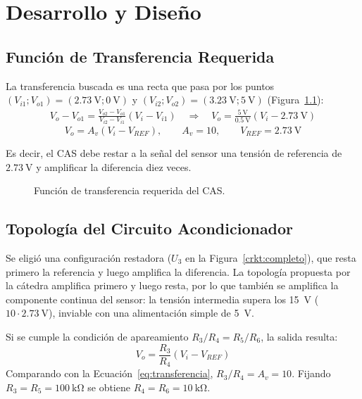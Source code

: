 \chapter{Desarrollo y Diseño}
\label{sec:desarrollo}

\section{Función de Transferencia Requerida}

La transferencia buscada es una recta que pasa por los puntos $(V_{i1}; V_{o1}) = (\SI{2.73}{\volt}; \SI{0}{\volt})$
y $(V_{i2}; V_{o2}) = (\SI{3.23}{\volt}; \SI{5}{\volt})$ (Figura~\ref{fig:transferencia_requerida}):
\begin{gather*}
  V_o - V_{o1} = \frac{V_{o2} - V_{o1}}{V_{i2} - V_{i1}} \left( V_i - V_{i1} \right)
  \quad\Rightarrow\quad
  V_o = \frac{\SI{5}{\volt}}{\SI{0.5}{\volt}} \left( V_i - \SI{2.73}{\volt} \right)
\end{gather*}
\begin{equation}
  V_o = A_v \left( V_i - V_{REF} \right), \qquad A_v = 10, \qquad V_{REF} = \SI{2.73}{\volt}
  \label{eq:transferencia}
\end{equation}

Es decir, el CAS debe restar a la señal del sensor una tensión de referencia de $\SI{2.73}{\volt}$ y amplificar la
diferencia diez veces.

\begin{figure}[!ht]
  \centering
  
  \caption{Función de transferencia requerida del CAS.}
  \label{fig:transferencia_requerida}
\end{figure}

\section{Topología del Circuito Acondicionador}

Se eligió una configuración restadora ($U_3$ en la Figura~\ref{crkt:completo}), que resta primero la referencia y luego amplifica
la diferencia. La topología propuesta por la cátedra amplifica primero y luego resta, por lo que también se amplifica
la componente continua del sensor: la tensión intermedia supera los \SI{15}{\volt} ($10 \cdot \SI{2.73}{\volt}$), inviable
con una alimentación simple de \SI{5}{\volt}.

Si se cumple la condición de apareamiento $R_3/R_4 = R_5/R_6$, la salida resulta:
\begin{equation}
  V_o = \frac{R_3}{R_4} \left( V_i - V_{REF} \right)
  \label{eq:restador}
\end{equation}
Comparando con la Ecuación~\ref{eq:transferencia}, $R_3/R_4 = A_v = 10$. Fijando $R_3 = R_5 = \SI{100}{\kilo\ohm}$ se
obtiene $R_4 = R_6 = \SI{10}{\kilo\ohm}$.

